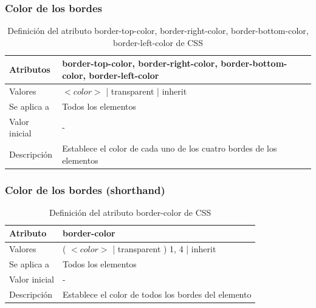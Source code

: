 \documentclass[ucs]{beamer}
\begin{document}

\begin{frame}
\frametitle{Color de los bordes}

\begin{center}
  \begin{table}
   \begin{tabular}{p{1.8cm}p{7.8cm}}
Atributos & \bf{border-top-color}, \bf{border-right-color}, \bf{border-bottom-color}, \bf{border-left-color} \\ \hline
Valores & $<color>$ | transparent | inherit \\ \hline
Se aplica a & Todos los elementos \\ \hline
Valor inicial & - \\ \hline
Descripción & Establece el color de cada uno de los cuatro bordes de los elementos \\ \hline
  \end{tabular}
   \caption{Definición del atributo border-top-color, border-right-color, border-bottom-color, border-left-color de CSS}
 \end{table}
\end{center}

\end{frame}


\begin{frame}
\frametitle{Color de los bordes (shorthand)}

\begin{center}
  \begin{table}
   \begin{tabular}{p{1.8cm}p{7.8cm}}
Atributo &\bf{border-color} \\ \hline
Valores & ( $<color>$ | transparent ) {1, 4} | inherit \\ \hline
Se aplica a & Todos los elementos \\ \hline
Valor inicial & - \\ \hline
Descripción & Establece el color de todos los bordes del elemento \\ \hline
  \end{tabular}
   \caption{Definición del atributo border-color de CSS}
 \end{table}
\end{center}

\end{frame}
\end{document}
